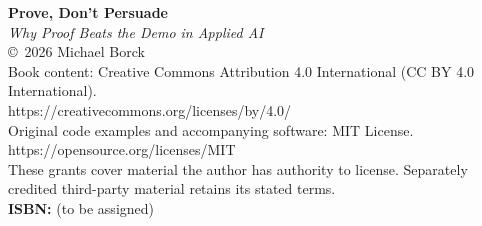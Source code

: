 \thispagestyle{empty}
\vspace*{2in}
\begin{center}
\textbf{\large Prove, Don't Persuade}\\[0.3em]
\textit{Why Proof Beats the Demo in Applied AI}\\[1em]
\copyright\ 2026 Michael Borck\\[0.5em]
Book content: Creative Commons Attribution 4.0 International (CC BY 4.0 International).\\
https://creativecommons.org/licenses/by/4.0/\\[0.5em]
Original code examples and accompanying software: MIT License.\\
https://opensource.org/licenses/MIT\\[0.5em]
These grants cover material the author has authority to license. Separately credited third-party material retains its stated terms.\\[1em]
\textbf{ISBN:} (to be assigned)\\[1em]
\end{center}
\clearpage
